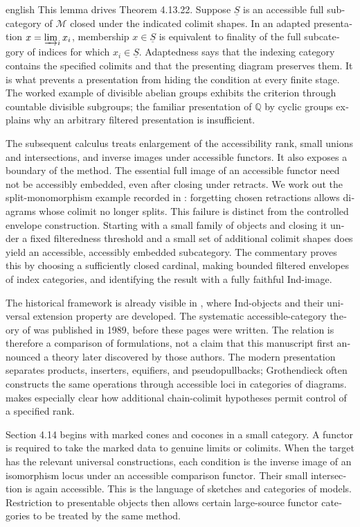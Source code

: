 \begin{otherlanguage}{english}
\begin{otherlanguage*}{english}
This lemma drives Theorem 4.13.22. Suppose $\underline S$ is an accessible full subcategory of $\mathcal M$ closed under the indicated colimit shapes. In an adapted presentation $x=\varinjlim_i x_i$, membership $x\in\underline S$ is equivalent to finality of the full subcategory of indices for which $x_i\in\underline S$. Adaptedness says that the indexing category contains the specified colimits and that the presenting diagram preserves them. It is what prevents a presentation from hiding the condition at every finite stage. The worked example of divisible abelian groups exhibits the criterion through countable divisible subgroups; the familiar presentation of $\mathbb Q$ by cyclic groups explains why an arbitrary filtered presentation is insufficient.

The subsequent calculus treats enlargement of the accessibility rank, small unions and intersections, and inverse images under accessible functors. It also exposes a boundary of the method. The essential full image of an accessible functor need not be accessibly embedded, even after closing under retracts. We work out the split-monomorphism example recorded in \citet{Rosicky2009Combinatorial,BrookeTaylorRosicky2017}: forgetting chosen retractions allows diagrams whose colimit no longer splits. This failure is distinct from the controlled envelope construction. Starting with a small family of objects and closing it under a fixed filteredness threshold and a small set of additional colimit shapes does yield an accessible, accessibly embedded subcategory. The commentary proves this by choosing a sufficiently closed cardinal, making bounded filtered envelopes of index categories, and identifying the result with a fully faithful Ind-image.

The historical framework is already visible in \citet[Expos\'e I, 8.7]{SGA4I1972}, where Ind-objects and their universal extension property are developed. The systematic accessible-category theory of \citet{MakkaiPare1989} was published in 1989, before these pages were written. The relation is therefore a comparison of formulations, not a claim that this manuscript first announced a theory later discovered by those authors. The modern presentation separates products, inserters, equifiers, and pseudopullbacks; Grothendieck often constructs the same operations through accessible loci in categories of diagrams. \citet{Positselski2024Limits} makes especially clear how additional chain-colimit hypotheses permit control of a specified rank.

Section 4.14 begins with marked cones and cocones in a small category. A functor is required to take the marked data to genuine limits or colimits. When the target has the relevant universal constructions, each condition is the inverse image of an isomorphism locus under an accessible comparison functor. Their small intersection is again accessible. This is the language of sketches and categories of models. Restriction to presentable objects then allows certain large-source functor categories to be treated by the same method.


\end{otherlanguage*}
\end{otherlanguage}
